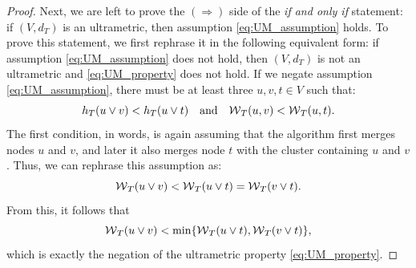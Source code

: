 \begin{proof}
Next, we are left to prove the $(\Rightarrow)$ side of the \emph{if and only if} statement: if $(V, d_{T})$ is an ultrametric, then assumption \ref{eq:UM_assumption} holds.
To prove this statement, we first rephrase it in the following equivalent form: if assumption \ref{eq:UM_assumption} does not hold, then $(V, d_{T})$ is not an ultrametric and \ref{eq:UM_property} does not hold. If we negate assumption \ref{eq:UM_assumption}, there must be at least three $u,v,t \in V$ such that: 
\begin{equation}
h_T(u \vee v) < h_T(u \vee t) \quad \text{and} \quad  \mathcal{W}{}_{T}(u,v) < \mathcal{W}{}_{T}(u,t).
\end{equation}
The first condition, in words, is again assuming that the algorithm first merges nodes $u$ and $v$, and later it also merges node $t$ with the cluster containing $u$ and $v$. Thus, we can rephrase this assumption as:
\begin{equation}
\mathcal{W}{}_{T}(u \vee v) < \mathcal{W}{}_{T}(u \vee t) = \mathcal{W}{}_{T}(v \vee t).
\end{equation}
From this, it follows that
\begin{equation}
\mathcal{W}{}_{T}(u \vee v) < \min \{\mathcal{W}{}_{T}(u \vee t), \mathcal{W}{}_{T}(v \vee t)\},
\end{equation}
which is exactly the negation of the ultrametric property \ref{eq:UM_property}.
\end{proof}

